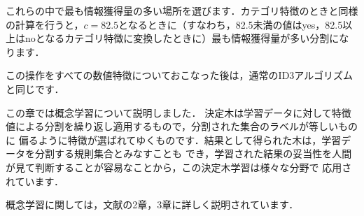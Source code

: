 これらの中で最も情報獲得量の多い場所を選びます．カテゴリ特徴のときと同様の計算を行うと，$c=82.5$となるときに（すなわち，82.5未満の値はyes，82.5以上はnoとなるカテゴリ特徴に変換したときに）最も情報獲得量が多い分割になります．

この操作をすべての数値特徴についておこなった後は，通常のID3アルゴリズムと同じです．


この章では概念学習について説明しました．
決定木は学習データに対して特徴値による分割を繰り返し適用するもので，分割された集合のラベルが等しいものに
偏るように特徴が選ばれてゆくものです．結果として得られた木は，学習データを分割する規則集合とみなすことも
でき，学習された結果の妥当性を人間が見て判断することが容易なことから，この決定木学習は様々な分野で
応用されています．

概念学習に関しては，文献\cite{mitchell97}の2章，3章に詳しく説明されています．

